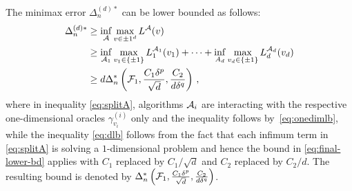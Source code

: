 The minimax error $\Delta_n^{(d)*}$ can be lower bounded as follows:
\begin{align}
\Delta_n^{(d)*}  &\ge  \inf_{\mathcal{A}} \max_{v\in {\pm 1}^d} L^{\mathcal{A}}(v) \nonumber\\
 & \ge \inf_{\mathcal{A}_1} \max_{v_1\in \{\pm 1\}} L_1^{\mathcal{A}_1}(v_1) + \dots + 
 			\inf_{A_d} \max_{v_d\in \{\pm 1 \}} L_d^{\mathcal{A}_d}(v_d) \label{eq:splitA}\\
               & \ge d \Delta_n^{*}\left(\mathcal{F}_1,\frac{C_1\delta^p}{\sqrt d}, \frac{C_2}{d\delta^q}\right)\,, \label{eq:dlb}
\end{align}
where in inequality \eqref{eq:splitA}, algorithms $\mathcal{A}_i$ are interacting with the respective one-dimensional oracles $\gamma^{(i)}_{v_i}$ only 
and the inequality follows by~\eqref{eq:onedimlb},
while the inequality \eqref{eq:dlb} follows from the fact that each infimum term in \eqref{eq:splitA} is solving a $1$-dimensional problem and hence the bound in \eqref{eq:final-lower-bd} applies with $C_1$ replaced by $C_1/\sqrt{d}$ and $C_2$ replaced by $C_2/d$. The resulting bound is denoted by $\Delta_n^{*}\left(\mathcal{F}_1,\frac{C_1\delta^p}{\sqrt d}, \frac{C_2}{d\delta^q}\right)$. 
\fi

